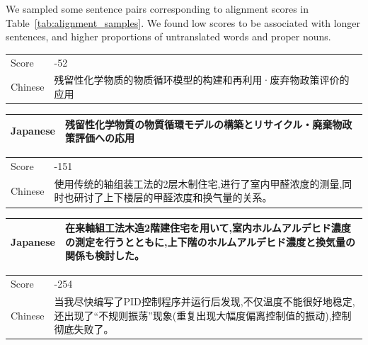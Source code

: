 We sampled some sentence pairs corresponding to alignment scores in Table~\ref{tab:alignment_samples}. We found low scores to be associated with longer sentences, and higher proportions of untranslated words and proper nouns.

\vspace{0.3cm}
\begin{table}[h]
    \centering
    \begin{CJK}{UTF8}{gbsn}
        \begin{tabularx}{\textwidth}{lb}\toprule
            Score & -52 \\
            {Chinese } & 残留性化学物质的物质循环模型的构建和再利用·废弃物政策评价的应用 \\
        \end{tabularx}
    \end{CJK}
    \begin{CJK}{UTF8}{ipxm}
        \begin{tabularx}{\textwidth}{lb}
            Japanese & 残留性化学物質の物質循環モデルの構築とリサイクル・廃棄物政策評価への応用 \\
            \midrule
        \end{tabularx}
    \end{CJK}
    \begin{CJK}{UTF8}{gbsn}
        \begin{tabularx}{\textwidth}{lb}
            Score & -151 \\
            {Chinese } & 使用传统的轴组装工法的2层木制住宅,进行了室内甲醛浓度的测量,同时也研讨了上下楼层的甲醛浓度和换气量的关系。 \\
        \end{tabularx}
    \end{CJK}
    \begin{CJK}{UTF8}{ipxm}
        \begin{tabularx}{\textwidth}{lb}
            Japanese & 在来軸組工法木造2階建住宅を用いて,室内ホルムアルデヒド濃度の測定を行うとともに,上下階のホルムアルデヒド濃度と換気量の関係も検討した。 \\
            \midrule
        \end{tabularx}
    \end{CJK}
    \begin{CJK}{UTF8}{gbsn}
        \begin{tabularx}{\textwidth}{lb}
            Score & -254 \\
            {Chinese } & 当我尽快编写了PID控制程序并运行后发现,不仅温度不能很好地稳定,还出现了“不规则振荡”现象(重复出现大幅度偏离控制值的振动),控制彻底失败了。 \\

\end{tabularx}
\end{CJK}
\end{table}
